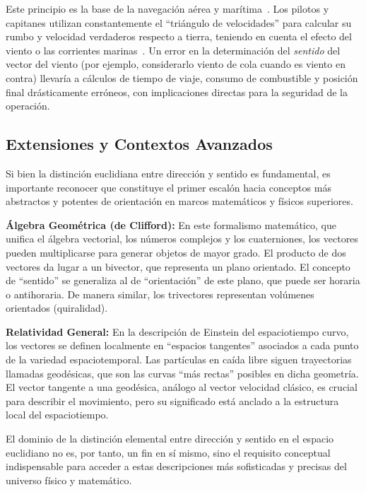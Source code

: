 \documentclass[12pt,a4paper]{article}
\begin{document}
Este principio es la base de la navegación aérea y marítima~\cite{tripod_cinematica}. Los pilotos y capitanes utilizan constantemente el ``triángulo de velocidades'' para calcular su rumbo y velocidad verdaderos respecto a tierra, teniendo en cuenta el efecto del viento o las corrientes marinas~\cite{tripod_cinematica}. Un error en la determinación del \emph{sentido} del vector del viento (por ejemplo, considerarlo viento de cola cuando es viento en contra) llevaría a cálculos de tiempo de viaje, consumo de combustible y posición final drásticamente erróneos, con implicaciones directas para la seguridad de la operación.

\subsection{Extensiones y Contextos Avanzados} \label{subsec:extensiones}

Si bien la distinción euclidiana entre dirección y sentido es fundamental, es importante reconocer que constituye el primer escalón hacia conceptos más abstractos y potentes de orientación en marcos matemáticos y físicos superiores.

\textbf{Álgebra Geométrica (de Clifford):} En este formalismo matemático, que unifica el álgebra vectorial, los números complejos y los cuaterniones, los vectores pueden multiplicarse para generar objetos de mayor grado. El producto de dos vectores da lugar a un bivector, que representa un plano orientado. El concepto de ``sentido'' se generaliza al de ``orientación'' de este plano, que puede ser horaria o antihoraria. De manera similar, los trivectores representan volúmenes orientados (quiralidad).

\textbf{Relatividad General:} En la descripción de Einstein del espaciotiempo curvo, los vectores se definen localmente en ``espacios tangentes'' asociados a cada punto de la variedad espaciotemporal. Las partículas en caída libre siguen trayectorias llamadas geodésicas, que son las curvas ``más rectas'' posibles en dicha geometría. El vector tangente a una geodésica, análogo al vector velocidad clásico, es crucial para describir el movimiento, pero su significado está anclado a la estructura local del espaciotiempo.

El dominio de la distinción elemental entre dirección y sentido en el espacio euclidiano no es, por tanto, un fin en sí mismo, sino el requisito conceptual indispensable para acceder a estas descripciones más sofisticadas y precisas del universo físico y matemático.
\end{document}
